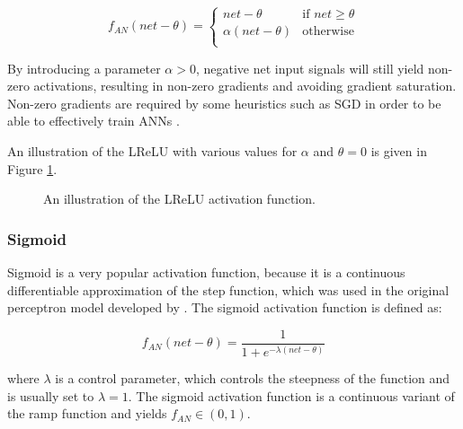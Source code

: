 \begin{equation}
    f_{AN}(net - \theta) = 
    \begin{cases}
        net - \theta & \text{if $net \geq \theta $}\\
        \alpha(net - \theta) & \text{otherwise}\\
    \end{cases}
    \label{eq:leaky_relu}
\end{equation}

\noindent
By introducing a parameter $\alpha >
0$, negative net input signals will still yield
non-zero activations, resulting in non-zero gradients and avoiding gradient
saturation. Non-zero gradients are required by some heuristics such as
\ac{SGD} in order to be able to effectively train \acp{ANN}
\cite{ref:hanin:2018}.

An illustration of the \ac{LReLU} with various values for $\alpha$ and $\theta =
0$ is given in Figure \ref{fig:anns:activation_functions:leaky_relu}.

\begin{figure}[htpb]
    \centering
    
    \caption[The \ac{LReLU} activation function]{An illustration of the
    \acs{LReLU} activation function.}
    \label{fig:anns:activation_functions:leaky_relu}
\end{figure}


\subsubsection{Sigmoid}
\label{sec:anns:an:act_functions:sigmoid}

Sigmoid is a very popular activation
function, because it is a continuous differentiable approximation of the step function, which was used in the original perceptron model developed by \citeauthor{ref:rosenblatt:1957} \cite{ref:rosenblatt:1957}. The
sigmoid activation function is defined
as:
	
\begin{equation}
    f_{AN}(net - \theta) = \frac{1}{1+e^{-\lambda(net - \theta)}}
    \label{eq:sigmoid}
\end{equation}

\noindent where $\lambda$ is a control parameter, which controls the steepness
of the function and is usually set to $\lambda = 1$.  \noindent The
sigmoid activation function is a
continuous variant of the ramp function and yields $f_{AN} \in (0,1)$.

